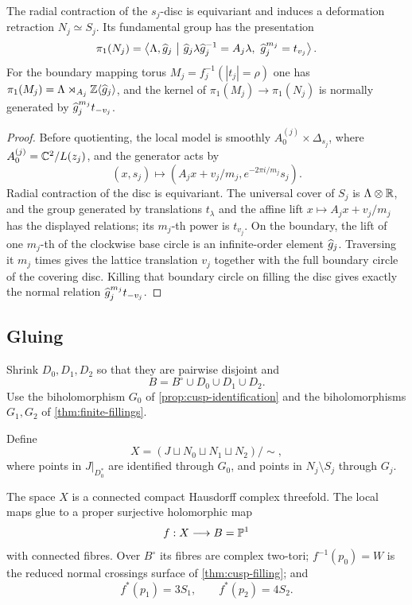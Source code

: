 \begin{proposition}\label{prop:pi1-Nj}
The radial contraction of the $s_j$-disc is equivariant and induces a
deformation retraction $N_j\simeq S_j$.  Its fundamental group has the
presentation
\[
 \pi_1(N_j)=
 \left\langle \Lambda,\widehat g_j\ \middle|\
 \widehat g_j\lambda\widehat g_j^{-1}=A_j\lambda,
 \ \widehat g_j^{m_j}=t_{v_j}
 \right\rangle.
\]
For the boundary mapping torus $M_j=f_j^{-1}(|t_j|=\rho)$ one has
$\pi_1(M_j)=\Lambda\rtimes_{A_j}\mathbb Z\langle\widehat g_j\rangle$, and the
kernel of $\pi_1(M_j)\to\pi_1(N_j)$ is normally generated by
$\widehat g_j^{m_j}t_{-v_j}$.
\end{proposition}

\begin{proof}
Before quotienting, the local model is smoothly
$A_0^{(j)}\times\Delta_{s_j}$, where
$A_0^{(j)}=\mathbb C^2/L(z_j)$, and the generator acts by
\[
 (x,s_j)\longmapsto(A_jx+v_j/m_j,
 e^{-2\pi i/m_j}s_j).
\]
Radial contraction of the disc is equivariant.  The universal cover of
$S_j$ is $\Lambda\otimes\mathbb R$, and the group generated by translations
$t_\lambda$ and the affine lift
$x\mapsto A_jx+v_j/m_j$ has the displayed relations; its $m_j$-th power
is $t_{v_j}$.  On the boundary, the lift of one $m_j$-th of the clockwise
base circle is an infinite-order element $\widehat g_j$.  Traversing it
$m_j$ times gives the lattice translation $v_j$ together with the full
boundary circle of the covering disc.  Killing that boundary circle on
filling the disc gives exactly the normal relation
$\widehat g_j^{m_j}t_{-v_j}$.
\end{proof}

\subsection{Gluing}
Shrink $D_0,D_1,D_2$ so that they are pairwise disjoint and
\[
 B=B^\circ\cup D_0\cup D_1\cup D_2.
\]
Use the biholomorphism $G_0$ of \cref{prop:cusp-identification} and the
biholomorphisms $G_1,G_2$ of \cref{thm:finite-fillings}.

Define
\[
 X=(J\sqcup N_0\sqcup N_1\sqcup N_2)/\sim,
\]
where points in $J|_{D_0^*}$ are identified through $G_0$, and points in
$N_j\setminus S_j$ through $G_j$.

\begin{theorem}\label{thm:global-X}
The space $X$ is a connected compact Hausdorff complex threefold.  The
local maps glue to a proper surjective holomorphic map
\[
 f:X\longrightarrow B=\mathbb P^1
\]
with connected fibres.  Over $B^\circ$ its fibres are complex two-tori;
$f^{-1}(p_0)=W$ is the reduced normal crossings surface of
\cref{thm:cusp-filling}; and
\[
 f^*(p_1)=3S_1,
 \qquad
 f^*(p_2)=4S_2.
\]
\end{theorem}


